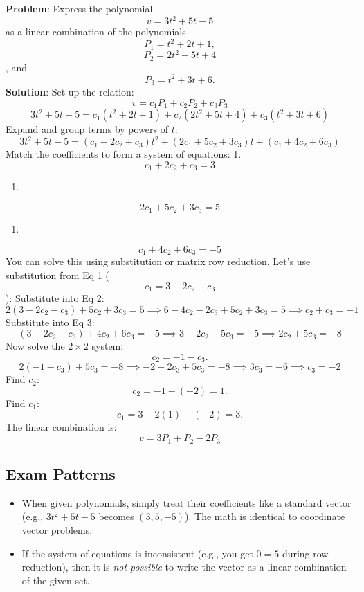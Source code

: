 \documentclass[
]{article}
\providecommand{\tightlist}{%
  \setlength{\itemsep}{0pt}\setlength{\parskip}{0pt}}
\begin{document}
\textbf{Problem}: Express the polynomial
\[
v = 3t^2 + 5t - 5
\]
as a linear combination of the polynomials
\[
P_1 = t^2 + 2t + 1,
\]
\[
P_2 = 2t^2 + 5t + 4
\]
, and
\[
P_3 = t^2 + 3t + 6.
\]
\textbf{Solution}: Set up the relation:
\[
v = c_1 P_1 + c_2 P_2 + c_3 P_3
\]
\[
3t^2 + 5t - 5 = c_1(t^2 + 2t + 1) + c_2(2t^2 + 5t + 4) + c_3(t^2 + 3t + 6)
\]
Expand and group terms by powers of \(t\):
\[
3t^2 + 5t - 5 = (c_1 + 2c_2 + c_3)t^2 + (2c_1 + 5c_2 + 3c_3)t + (c_1 + 4c_2 + 6c_3)
\]
Match the coefficients to form a system of equations: 1.
\[
c_1 + 2c_2 + c_3 = 3
\]
\begin{enumerate}
\def\labelenumi{\arabic{enumi}.}
\setcounter{enumi}{1}
\tightlist
\item
\end{enumerate}
\[
2c_1 + 5c_2 + 3c_3 = 5
\]
\begin{enumerate}
\def\labelenumi{\arabic{enumi}.}
\setcounter{enumi}{2}
\tightlist
\item
\end{enumerate}
\[
c_1 + 4c_2 + 6c_3 = -5
\]
You can solve this using substitution or matrix row reduction. Let's use
substitution from Eq 1 (
\[
c_1 = 3 - 2c_2 - c_3
\]
): Substitute into Eq 2:
\[
2(3 - 2c_2 - c_3) + 5c_2 + 3c_3 = 5 \implies 6 - 4c_2 - 2c_3 + 5c_2 + 3c_3 = 5 \implies c_2 + c_3 = -1
\]
Substitute into Eq 3:
\[
(3 - 2c_2 - c_3) + 4c_2 + 6c_3 = -5 \implies 3 + 2c_2 + 5c_3 = -5 \implies 2c_2 + 5c_3 = -8
\]
Now solve the \(2 \times 2\) system:
\[
c_2 = -1 - c_3.
\]
\[
2(-1 - c_3) + 5c_3 = -8 \implies -2 - 2c_3 + 5c_3 = -8 \implies 3c_3 = -6 \implies c_3 = -2
\]
Find \(c_2\):
\[
c_2 = -1 - (-2) = 1.
\]
Find \(c_1\):
\[
c_1 = 3 - 2(1) - (-2) = 3.
\]
The linear combination is:
\[
v = 3P_1 + P_2 - 2P_3
\]

\subsection{Exam Patterns}\label{exam-patterns-32}

\begin{itemize}
\tightlist
\item
  When given polynomials, simply treat their coefficients like a
  standard vector (e.g., \(3t^2 + 5t - 5\) becomes \((3, 5, -5)\)). The
  math is identical to coordinate vector problems.
\item
  If the system of equations is inconsistent (e.g., you get \(0 = 5\)
  during row reduction), then it is \emph{not possible} to write the
  vector as a linear combination of the given set.
\end{itemize}
\end{document}
